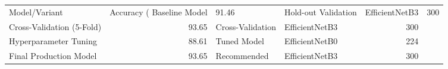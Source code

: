 \begin{tabular}{lrllr}
\toprule
Model/Variant & Accuracy (%
\midrule
Baseline Model & 91.46 & Hold-out Validation & EfficientNetB3 & 300 \\
Cross-Validation (5-Fold) & 93.65 & Cross-Validation & EfficientNetB3 & 300 \\
Hyperparameter Tuning & 88.61 & Tuned Model & EfficientNetB0 & 224 \\
Final Production Model & 93.65 & Recommended & EfficientNetB3 & 300 \\
\bottomrule
\end{tabular}
